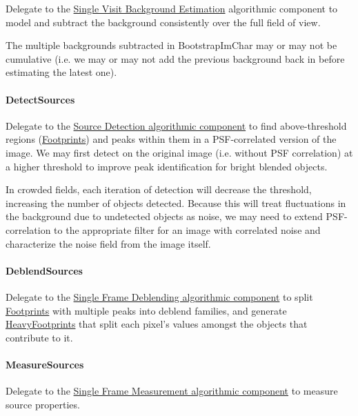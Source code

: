 Delegate to the \hyperref[sec:acSingleVisitBackgroundEstimation]{Single Visit Background Estimation} algorithmic component to model and subtract the background consistently over the full field of view.

The multiple backgrounds subtracted in BootstrapImChar may or may not be cumulative (i.e. we may or may not add the previous background back in before estimating the latest one).

\paragraph{DetectSources}
\label{sec:drpBootstrapImChar_DetectSources}

Delegate to the \hyperref[sec:acSourceDetection]{Source Detection algorithmic component} to find above-threshold regions (\hyperref[sec:spFootprints]{Footprints}) and peaks within them in a PSF-correlated version of the image.  We may first detect on the original image (i.e. without PSF correlation) at a higher threshold to improve peak identification for bright blended objects.

In crowded fields, each iteration of detection will decrease the threshold, increasing the number of objects detected.  Because this will treat fluctuations in the background due to undetected objects as noise, we may need to extend PSF-correlation to the appropriate filter for an image with correlated noise and characterize the noise field from the image itself.

\paragraph{DeblendSources}
\label{sec:drpBootstrapImChar_DeblendSources}

Delegate to the \hyperref[sec:acSingleFrameDeblending]{Single Frame Deblending algorithmic component} to split \hyperref[sec:spFootprints]{Footprints} with multiple peaks into deblend families, and generate \hyperref[sec:spFootprintsHeavy]{HeavyFootprints} that split each pixel's values amongst the objects that contribute to it.

\paragraph{MeasureSources}
\label{sec:drpBootstrapImChar_MeasureSources}

Delegate to the \hyperref[sec:acSingleFrameMeasurement]{Single Frame Measurement algorithmic component} to measure source properties.

